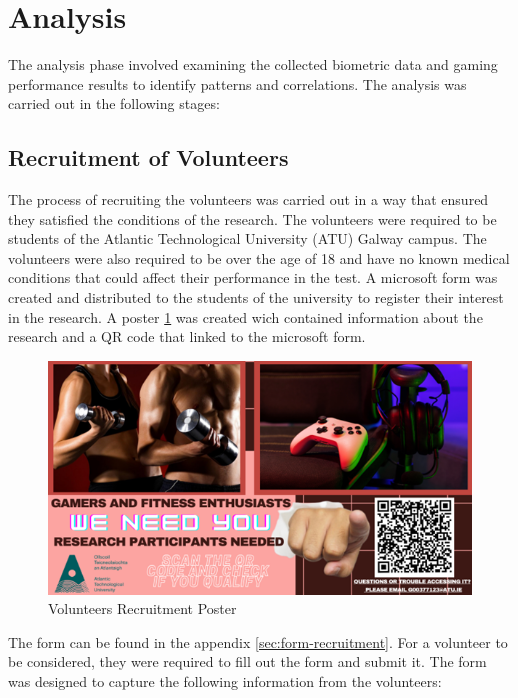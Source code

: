 \section{Analysis}
The analysis phase involved examining the collected biometric data and gaming performance results to identify patterns and correlations. The analysis was carried 
out in the following stages:

\subsection{Recruitment of Volunteers}
The process of recruiting the volunteers was carried out in a way that ensured they satisfied the conditions of the research. The volunteers were required to be students of the Atlantic 
Technological University (ATU) Galway campus. The volunteers were also required to be over the age of 18 and have no known medical conditions that could affect their performance in the
test. A microsoft form was created and distributed to the students of the university to register their interest in the research. A poster \ref{fig:recruitment-poster} was created
wich contained information about the research and a QR code that linked to the microsoft form.

\begin{figure}[ht]
    \centering
    \includegraphics[width=0.95\linewidth]{images/poster.png}
    \caption{Volunteers Recruitment Poster}
    \label{fig:recruitment-poster}
\end{figure}

The form can be found in the appendix \ref{sec:form-recruitment}.
For a volunteer to be considered, they were required to fill out the form and submit it. The form was designed to capture the following information from the volunteers:

